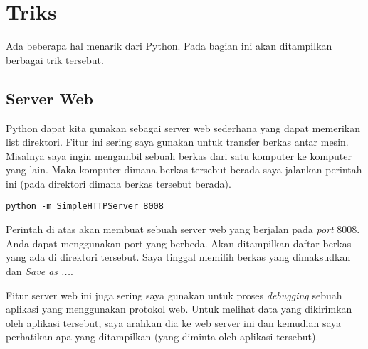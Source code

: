 \chapter{Triks}
Ada beberapa hal menarik dari Python. Pada bagian ini akan ditampilkan berbagai
trik tersebut.

\section{Server Web}
Python dapat kita gunakan sebagai server web sederhana yang dapat memerikan
list direktori. Fitur ini sering saya gunakan untuk transfer berkas antar
mesin. Misalnya saya ingin mengambil sebuah berkas dari satu komputer ke
komputer yang lain. Maka komputer dimana berkas tersebut berada saya jalankan
perintah ini (pada direktori dimana berkas tersebut berada).

\begin{verbatim}
python -m SimpleHTTPServer 8008
\end{verbatim}

Perintah di atas akan membuat sebuah server web yang berjalan pada {\em port}
8008. Anda dapat menggunakan port yang berbeda.
Akan ditampilkan daftar berkas yang ada di direktori tersebut. Saya tinggal
memilih berkas yang dimaksudkan dan {\em Save as ...}.

Fitur server web ini juga sering saya gunakan untuk proses {\em debugging}
sebuah aplikasi yang menggunakan protokol web. Untuk melihat data yang
dikirimkan oleh aplikasi tersebut, saya arahkan dia ke web server ini dan
kemudian saya perhatikan apa yang ditampilkan (yang diminta oleh aplikasi
tersebut).
